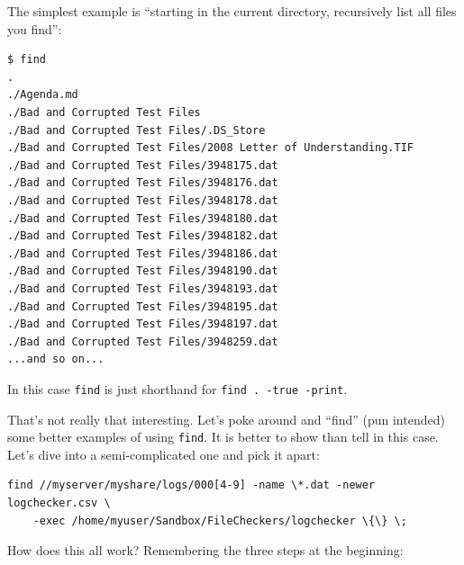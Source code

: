 \documentclass[10pt,]{book}
\numberwithin{figure}{chapter}
\begin{document}
The simplest example is ``starting in the current directory, recursively
list all files you find'':

\begin{verbatim}
$ find
.
./Agenda.md
./Bad and Corrupted Test Files
./Bad and Corrupted Test Files/.DS_Store
./Bad and Corrupted Test Files/2008 Letter of Understanding.TIF
./Bad and Corrupted Test Files/3948175.dat
./Bad and Corrupted Test Files/3948176.dat
./Bad and Corrupted Test Files/3948178.dat
./Bad and Corrupted Test Files/3948180.dat
./Bad and Corrupted Test Files/3948182.dat
./Bad and Corrupted Test Files/3948186.dat
./Bad and Corrupted Test Files/3948190.dat
./Bad and Corrupted Test Files/3948193.dat
./Bad and Corrupted Test Files/3948195.dat
./Bad and Corrupted Test Files/3948197.dat
./Bad and Corrupted Test Files/3948259.dat
...and so on...
\end{verbatim}

In this case \texttt{find} is just shorthand for
\texttt{find . -true -print}.

That's not really that interesting. Let's poke around and ``find'' (pun
intended) some better examples of using \texttt{find}. It is better to
show than tell in this case. Let's dive into a semi-complicated one and
pick it apart:

\begin{verbatim}
find //myserver/myshare/logs/000[4-9] -name \*.dat -newer logchecker.csv \
    -exec /home/myuser/Sandbox/FileCheckers/logchecker \{\} \;
\end{verbatim}

How does this all work? Remembering the three steps at the beginning:
\end{document}

